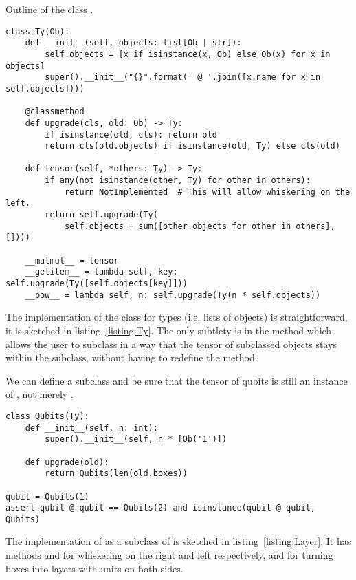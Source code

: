 \begin{python}\label{listing:Ty}
{\normalfont Outline of the class .}
\begin{verbatim}
class Ty(Ob):
    def __init__(self, objects: list[Ob | str]):
        self.objects = [x if isinstance(x, Ob) else Ob(x) for x in objects]
        super().__init__("{}".format(' @ '.join([x.name for x in self.objects])))

    @classmethod
    def upgrade(cls, old: Ob) -> Ty:
        if isinstance(old, cls): return old
        return cls(old.objects) if isinstance(old, Ty) else cls(old)

    def tensor(self, *others: Ty) -> Ty:
        if any(not isinstance(other, Ty) for other in others):
            return NotImplemented  # This will allow whiskering on the left.
        return self.upgrade(Ty(
            self.objects + sum([other.objects for other in others], [])))

    __matmul__ = tensor
    __getitem__ = lambda self, key: self.upgrade(Ty([self.objects[key]]))
    __pow__ = lambda self, n: self.upgrade(Ty(n * self.objects))
\end{verbatim}
\end{python}

The implementation of the class  for types (i.e. lists of objects) is straightforward, it is sketched in listing~\ref{listing:Ty}.
The only subtlety is in the method  which allows the user to subclass  in a way that the tensor of subclassed objects stays within the subclass, without having to redefine the  method.

\begin{example}
We can define a  subclass and be sure that the tensor of qubits is still an instance of , not merely .
\begin{verbatim}
class Qubits(Ty):
    def __init__(self, n: int):
        super().__init__(self, n * [Ob('1')])

    def upgrade(old):
        return Qubits(len(old.boxes))

qubit = Qubits(1)
assert qubit @ qubit == Qubits(2) and isinstance(qubit @ qubit, Qubits)
\end{verbatim}
\end{example}

The implementation of  as a subclass of  is sketched in listing~\ref{listing:Layer}.
It has methods  and   for whiskering on the right and left respectively, and  for turning boxes into layers with units on both sides.

